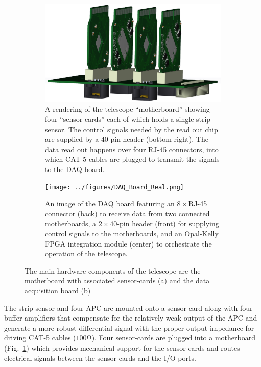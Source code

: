 \documentclass{PoS}
\begin{document}
\begin{figure}[h]
  \centering
  \begin{subfigure}[t]{0.45\textwidth}
    \includegraphics[width=\textwidth]{../figures/Half-Telescope-Full.png}
    \caption{\scriptsize A rendering of the telescope ``motherboard'' showing four
      ``sensor-cards'' each of which holds a single strip sensor. The control
      signals needed by the read out chip are supplied by a 40-pin header
      (bottom-right). The data read out happens over four RJ-45 connectors, into
      which CAT-5 cables are plugged to transmit the signals to the DAQ board.}
\label{fig:hardware:motherboard}
  \end{subfigure}
  \hspace{.3in}
  \begin{subfigure}[t]{0.45\textwidth}
    \texttt{[image: ../figures/DAQ\_Board\_Real.png]}
    \caption{\scriptsize An image of the DAQ board featuring an $8\times$RJ-45
      connector (back) to receive data from two connected motherboards, a
      $2\times40$-pin header (front) for supplying control signals to the
      motherboards, and an Opal-Kelly FPGA integration module (center) to
      orchestrate the operation of the telescope.}
\label{fig:hardware:daq}
  \end{subfigure}
  \caption{The main hardware components of the telescope are the motherboard
    with associated sensor-cards (a) and the data acquisition board (b)}
\label{fig:hardware}
\end{figure}

The strip sensor and four APC are mounted onto a sensor-card along
with four buffer amplifiers that compensate for the relatively weak output of
the APC and generate a more robust differential signal with the proper output
impedance for driving CAT-5 cables ($100\si{\ohm}$). Four sensor-cards are
plugged into a motherboard (Fig.~\ref{fig:hardware:motherboard}) which provides mechanical support for the
sensor-cards and routes electrical signals between the sensor cards and the I/O
ports.
\end{document}
